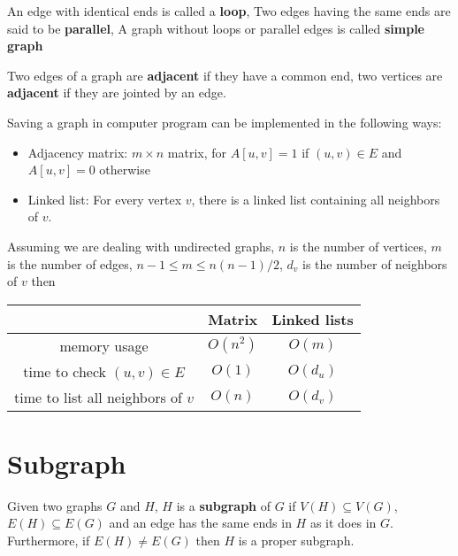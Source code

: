 				\begin{definition}
					An edge with identical ends is called a \textbf{loop}, Two edges having the same ends are said to be \textbf{parallel}, A graph without loops or parallel edges is called \textbf{simple graph}
				\end{definition}

				\begin{definition}[Adjacent]
					Two edges of a graph are \textbf{adjacent} if they have a common end, two vertices are \textbf{adjacent} if they are jointed by an edge.
				\end{definition}

				Saving a graph in computer program can be implemented in the following ways:
				\begin{itemize}
					\item Adjacency matrix: $m \times n$ matrix, for $A[u, v] = 1$ if $(u, v) \in E$ and $A[u, v] = 0$ otherwise
					\item Linked list: For every vertex $v$, there is a linked list containing all neighbors of $v$.
				\end{itemize}
				Assuming we are dealing with undirected graphs, $n$ is the number of vertices, $m$ is the number of edges, $n - 1 \le m \le n(n-1)/2$, $d_v$ is the number of neighbors of $v$ then
				\begin{table}[h]
					\centering
					\begin{tabular}{|c|c|c|}
						\hline
						 & Matrix & Linked lists\\
						\hline
						memory usage & $O(n^2)$ & $O(m)$\\
						\hline
						time to check $(u, v) \in E$ & $O(1)$ & $O(d_u)$\\
						\hline
						time to list all neighbors of $v$ & $O(n)$ & $O(d_v)$\\
						\hline
					\end{tabular}
				\end{table}

			\section{Subgraph}
				\begin{definition}[Subgraph]
					Given two graphs $G$ and $H$, $H$ is a \textbf{subgraph} of $G$ if $V(H)\subseteq V(G)$, $E(H)\subseteq E(G)$ and an edge has the same ends in $H$ as it does in $G$. Furthermore, if $E(H)\neq E(G)$ then $H$ is a proper subgraph.
				\end{definition}

